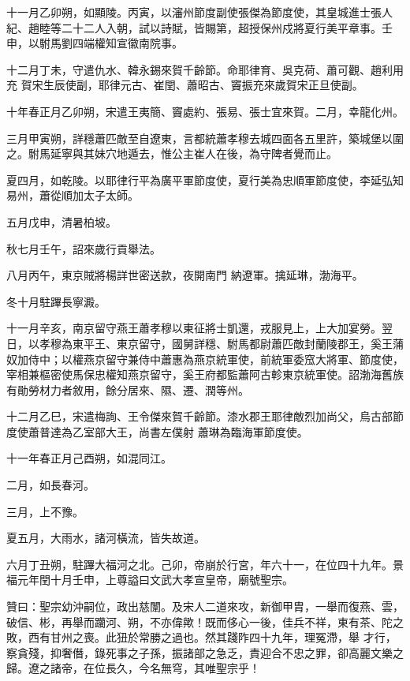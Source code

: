 \begin{pinyinscope}
 十一月乙卯朔，如顯陵。丙寅，以瀋州節度副使張傑為節度使，其皇城進士張人紀、趙睦等二十二人入朝，試以詩賦，皆賜第，超授保州戍將夏行美平章事。壬申，以駙馬劉四端權知宣徽南院事。



 十二月丁未，守遣仇水、韓永錫來賀千齡節。命耶律育、吳克荷、蕭可觀、趙利用充
 賀宋生辰使副，耶律元古、崔閏、蕭昭古、竇振充來歲賀宋正旦使副。



 十年春正月乙卯朔，宋遣王夷簡、竇處約、張易、張士宜來賀。二月，幸龍化州。



 三月甲寅朔，詳穩蕭匹敵至自遼東，言都統蕭孝穆去城四面各五里許，築城堡以圍之。駙馬延寧與其妹穴地遁去，惟公主崔人在後，為守陴者覺而止。



 夏四月，如乾陵。以耶律行平為廣平軍節度使，夏行美為忠順軍節度使，李延弘知易州，蕭從順加太子太師。



 五月戊申，清暑柏坡。



 秋七月壬午，詔來歲行貢舉法。



 八月丙午，東京賊將楊詳世密送款，夜開南門
 納遼軍。擒延琳，渤海平。



 冬十月駐蹕長寧澱。



 十一月辛亥，南京留守燕王蕭孝穆以東征將士凱還，戎服見上，上大加宴勞。翌日，以孝穆為東平王、東京留守，國舅詳穩、駙馬都尉蕭匹敵封蘭陵郡王，奚王蒲奴加侍中；以權燕京留守兼侍中蕭惠為燕京統軍使，前統軍委窊大將軍、節度使，宰相兼樞密使馬保忠權知燕京留守，奚王府都監蕭阿古軫東京統軍使。詔渤海舊族有勛勞材力者敘用，餘分居來、隰、遷、潤等州。



 十二月乙巳，宋遣梅詢、王令傑來賀千齡節。漆水郡王耶律敵烈加尚父，烏古部節度使蕭普達為乙室部大王，尚書左僕射
 蕭琳為臨海軍節度使。



 十一年春正月己酉朔，如混同江。



 二月，如長春河。



 三月，上不豫。



 夏五月，大雨水，諸河橫流，皆失故道。



 六月丁丑朔，駐蹕大福河之北。己卯，帝崩於行宮，年六十一，在位四十九年。景福元年閏十月壬申，上尊謚曰文武大孝宣皇帝，廟號聖宗。



 贊曰：聖宗幼沖嗣位，政出慈闈。及宋人二道來攻，新御甲胄，一舉而復燕、雲，破信、彬，再舉而躪河、朔，不亦偉歟！既而侈心一後，佳兵不祥，東有茶、陀之敗，西有甘州之喪。此狃於常勝之過也。然其踐阼四十九年，理冤滯，舉
 才行，察貪殘，抑奢僭，錄死事之子孫，振諸部之急乏，責迎合不忠之罪，卻高麗文樂之歸。遼之諸帝，在位長久，今名無穹，其唯聖宗乎！



\end{pinyinscope}